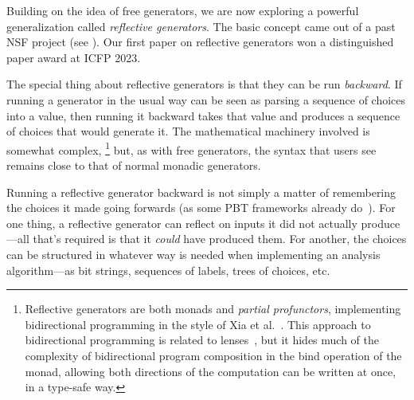  Building on the
idea of free generators, we are now exploring a powerful
generalization called {\em reflective
  generators}.  The basic concept came out of a
past NSF project (see ). Our first paper on
reflective generators won a distinguished paper award at ICFP 2023.

The special thing about reflective generators is that they can be run
{\em backward}.
If running a generator in the usual way can be seen as parsing a
sequence of choices into a
value, then running it backward takes that value and produces a
sequence of choices that
would generate it.
The mathematical machinery
involved is somewhat complex,%
\footnote{\normalsize Reflective generators are both monads and {\em
    partial profunctors},
implementing bidirectional programming in the style of Xia et
al.~\cite{xia2019composing}. This approach to bidirectional programming is
related to lenses~\cite{foster2009bidirectional}, but it hides much of the
complexity of bidirectional program composition in the bind operation of the
monad, allowing both directions of
the computation can be written at once, in a type-safe way.}
but, as with free generators, the syntax that users see remains close to
that of normal monadic generators.

Running a reflective generator backward is not simply a matter of remembering
the choices it made going forwards (as some PBT frameworks already
do~\cite{maciver2019hypothesis, hatfield-dodds_hypofuzz_nodate}). For one thing,
a reflective
generator can reflect on inputs it did not actually
produce---all that's required is that it {\em could} have produced
them.  For another, the choices can be structured in whatever way is needed
when implementing an analysis algorithm---as bit
strings, sequences of labels, trees of choices, etc.


